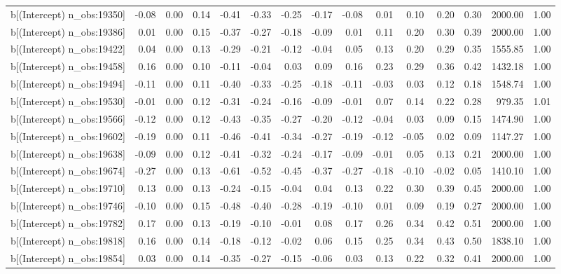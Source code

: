 \begin{table}[ht]
\begin{tabular}{rrrrrrrrrrrrrrr}
  b[(Intercept) n\_obs:19350] & -0.08 & 0.00 & 0.14 & -0.41 & -0.33 & -0.25 & -0.17 & -0.08 & 0.01 & 0.10 & 0.20 & 0.30 & 2000.00 & 1.00 \\ 
  b[(Intercept) n\_obs:19386] & 0.01 & 0.00 & 0.15 & -0.37 & -0.27 & -0.18 & -0.09 & 0.01 & 0.11 & 0.20 & 0.30 & 0.39 & 2000.00 & 1.00 \\ 
  b[(Intercept) n\_obs:19422] & 0.04 & 0.00 & 0.13 & -0.29 & -0.21 & -0.12 & -0.04 & 0.05 & 0.13 & 0.20 & 0.29 & 0.35 & 1555.85 & 1.00 \\ 
  b[(Intercept) n\_obs:19458] & 0.16 & 0.00 & 0.10 & -0.11 & -0.04 & 0.03 & 0.09 & 0.16 & 0.23 & 0.29 & 0.36 & 0.42 & 1432.18 & 1.00 \\ 
  b[(Intercept) n\_obs:19494] & -0.11 & 0.00 & 0.11 & -0.40 & -0.33 & -0.25 & -0.18 & -0.11 & -0.03 & 0.03 & 0.12 & 0.18 & 1548.74 & 1.00 \\ 
  b[(Intercept) n\_obs:19530] & -0.01 & 0.00 & 0.12 & -0.31 & -0.24 & -0.16 & -0.09 & -0.01 & 0.07 & 0.14 & 0.22 & 0.28 & 979.35 & 1.01 \\ 
  b[(Intercept) n\_obs:19566] & -0.12 & 0.00 & 0.12 & -0.43 & -0.35 & -0.27 & -0.20 & -0.12 & -0.04 & 0.03 & 0.09 & 0.15 & 1474.90 & 1.00 \\ 
  b[(Intercept) n\_obs:19602] & -0.19 & 0.00 & 0.11 & -0.46 & -0.41 & -0.34 & -0.27 & -0.19 & -0.12 & -0.05 & 0.02 & 0.09 & 1147.27 & 1.00 \\ 
  b[(Intercept) n\_obs:19638] & -0.09 & 0.00 & 0.12 & -0.41 & -0.32 & -0.24 & -0.17 & -0.09 & -0.01 & 0.05 & 0.13 & 0.21 & 2000.00 & 1.00 \\ 
  b[(Intercept) n\_obs:19674] & -0.27 & 0.00 & 0.13 & -0.61 & -0.52 & -0.45 & -0.37 & -0.27 & -0.18 & -0.10 & -0.02 & 0.05 & 1410.10 & 1.00 \\ 
  b[(Intercept) n\_obs:19710] & 0.13 & 0.00 & 0.13 & -0.24 & -0.15 & -0.04 & 0.04 & 0.13 & 0.22 & 0.30 & 0.39 & 0.45 & 2000.00 & 1.00 \\ 
  b[(Intercept) n\_obs:19746] & -0.10 & 0.00 & 0.15 & -0.48 & -0.40 & -0.28 & -0.19 & -0.10 & 0.01 & 0.09 & 0.19 & 0.27 & 2000.00 & 1.00 \\ 
  b[(Intercept) n\_obs:19782] & 0.17 & 0.00 & 0.13 & -0.19 & -0.10 & -0.01 & 0.08 & 0.17 & 0.26 & 0.34 & 0.42 & 0.51 & 2000.00 & 1.00 \\ 
  b[(Intercept) n\_obs:19818] & 0.16 & 0.00 & 0.14 & -0.18 & -0.12 & -0.02 & 0.06 & 0.15 & 0.25 & 0.34 & 0.43 & 0.50 & 1838.10 & 1.00 \\ 
  b[(Intercept) n\_obs:19854] & 0.03 & 0.00 & 0.14 & -0.35 & -0.27 & -0.15 & -0.06 & 0.03 & 0.13 & 0.22 & 0.32 & 0.41 & 2000.00 & 1.00 \\ 

\end{tabular}
\end{table}

